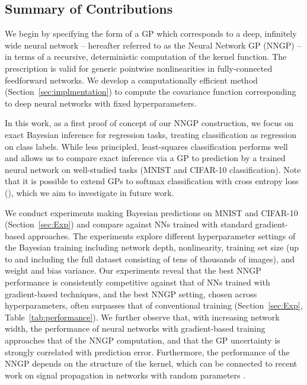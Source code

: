 \documentclass{article} %
\begin{document}
\subsection{Summary of Contributions}


We begin by specifying the form of a GP which corresponds to a deep, infinitely wide neural network -- hereafter referred to as the Neural Network GP (NNGP) -- in terms of a recursive, deterministic computation of the kernel function. The prescription is valid for generic pointwise nonlinearities in fully-connected feedforward networks. We develop a computationally efficient method (Section~\ref{sec:implmentation}) to compute the covariance function corresponding to deep neural networks with fixed hyperparameters.

In this work, as a first proof of concept of our NNGP construction, we focus on exact Bayesian inference for regression tasks, treating classification as regression on class labels.
While less principled, least-squares classification
performs well~\citep{rifkin2003regularized} and allows us to compare exact inference via a GP to prediction by a trained neural network on well-studied tasks (MNIST and CIFAR-10 classification). Note that it is possible to extend GPs to softmax classification with cross entropy loss (\cite{williams1998classification, rasmussen2006gaussian}), which we aim to investigate in future work.

We conduct experiments making Bayesian predictions on MNIST and CIFAR-10 (Section~\ref{sec:Exp}) and compare against NNs trained with standard gradient-based approaches. The experiments explore different hyperparameter settings of the Bayesian training including network depth, nonlinearity, training set size (up to and including the full dataset consisting of tens of thousands of images), and weight and bias variance. Our experiments reveal that the best NNGP performance is consistently competitive against that of NNs trained with gradient-based techniques, and the best NNGP setting, chosen across hyperparameters, often surpasses that of conventional training (Section~\ref{sec:Exp}, Table~\ref{tab:performance}). 
We further observe that, with increasing network width, the performance of neural networks with gradient-based training approaches that of the NNGP computation, and that the GP uncertainty is strongly correlated with prediction error. 
Furthermore, the performance of the NNGP depends on the structure of the kernel, which can be connected to recent work on signal propagation in networks with random parameters \citep{schoenholz2016}. 
\end{document}
